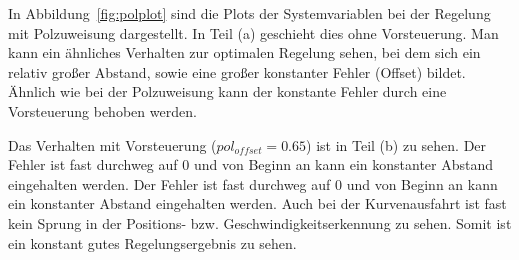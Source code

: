 In Abbildung~\ref{fig:polplot} sind die Plots der Systemvariablen bei der
Regelung mit Polzuweisung dargestellt. In Teil (a) geschieht dies ohne
Vorsteuerung. Man kann ein ähnliches Verhalten zur optimalen Regelung
sehen, bei dem sich ein relativ großer Abstand, sowie eine großer konstanter
Fehler (Offset) bildet. Ähnlich wie bei der Polzuweisung kann der konstante
Fehler durch eine Vorsteuerung behoben werden.

Das Verhalten mit Vorsteuerung ($pol_{offset} = 0.65$) ist in Teil (b) zu sehen.
Der Fehler ist fast durchweg auf 0 und von Beginn an kann ein konstanter Abstand
eingehalten werden. Der Fehler ist fast durchweg auf 0 und von Beginn
an kann ein konstanter Abstand eingehalten werden. Auch bei der Kurvenausfahrt
ist fast kein Sprung in der Positions- bzw. Geschwindigkeitserkennung zu sehen.
Somit ist ein konstant gutes Regelungsergebnis zu sehen.



